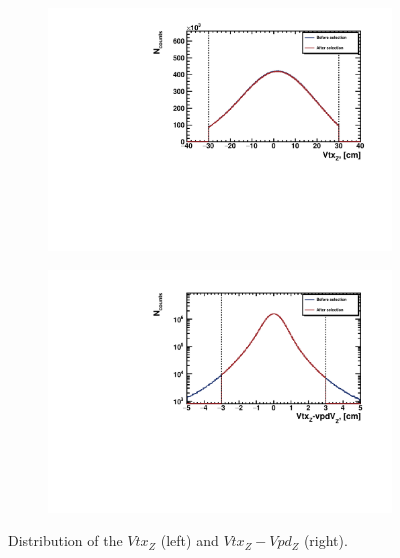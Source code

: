 \begin{figure}[ht]
    \begin{subfigure}{.49\textwidth}
        \centering
        \includegraphics[width=1.\linewidth]{Figures/VtxZ.pdf}
    \end{subfigure}
    \begin{subfigure}{.49\textwidth}
        \centering
        \includegraphics[width=1.\linewidth]{Figures/VtxVpdZ.pdf}
    \end{subfigure}
    \caption{Distribution of the $Vtx_Z$ (left) and $Vtx_Z - Vpd_Z$ (right).}
    \label{fig:VtxZCuts}
\end{figure}

